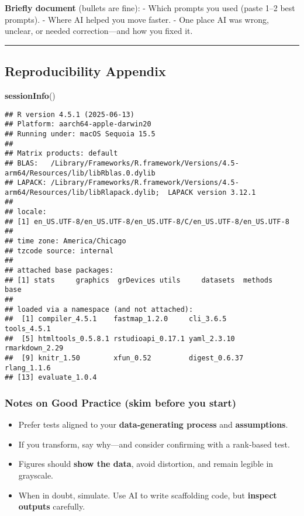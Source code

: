 \documentclass[
  11pt,
]{article}
\newenvironment{Shaded}{\begin{snugshade}}{\end{snugshade}}
\newcommand{\FunctionTok}[1]{\textcolor[rgb]{0.13,0.29,0.53}{\textbf{#1}}}
\newcommand{\NormalTok}[1]{#1}
\providecommand{\tightlist}{%
  \setlength{\itemsep}{0pt}\setlength{\parskip}{0pt}}
\begin{document}
\textbf{Briefly document} (bullets are fine): - Which prompts you used
(paste 1--2 best prompts). - Where AI helped you move faster. - One
place AI was wrong, unclear, or needed correction---and how you fixed
it.

\begin{center}\rule{0.5\linewidth}{0.5pt}\end{center}

\subsection{Reproducibility Appendix}\label{reproducibility-appendix}

\begin{Shaded}
\begin{Highlighting}[]
\FunctionTok{sessionInfo}\NormalTok{()}
\end{Highlighting}
\end{Shaded}

\begin{verbatim}
## R version 4.5.1 (2025-06-13)
## Platform: aarch64-apple-darwin20
## Running under: macOS Sequoia 15.5
## 
## Matrix products: default
## BLAS:   /Library/Frameworks/R.framework/Versions/4.5-arm64/Resources/lib/libRblas.0.dylib 
## LAPACK: /Library/Frameworks/R.framework/Versions/4.5-arm64/Resources/lib/libRlapack.dylib;  LAPACK version 3.12.1
## 
## locale:
## [1] en_US.UTF-8/en_US.UTF-8/en_US.UTF-8/C/en_US.UTF-8/en_US.UTF-8
## 
## time zone: America/Chicago
## tzcode source: internal
## 
## attached base packages:
## [1] stats     graphics  grDevices utils     datasets  methods   base     
## 
## loaded via a namespace (and not attached):
##  [1] compiler_4.5.1    fastmap_1.2.0     cli_3.6.5         tools_4.5.1      
##  [5] htmltools_0.5.8.1 rstudioapi_0.17.1 yaml_2.3.10       rmarkdown_2.29   
##  [9] knitr_1.50        xfun_0.52         digest_0.6.37     rlang_1.1.6      
## [13] evaluate_1.0.4
\end{verbatim}

\subsubsection{Notes on Good Practice (skim before you
start)}\label{notes-on-good-practice-skim-before-you-start}

\begin{itemize}
\tightlist
\item
  Prefer tests aligned to your \textbf{data‑generating process} and
  \textbf{assumptions}.
\item
  If you transform, say why---and consider confirming with a rank‑based
  test.
\item
  Figures should \textbf{show the data}, avoid distortion, and remain
  legible in grayscale.
\item
  When in doubt, simulate. Use AI to write scaffolding code, but
  \textbf{inspect outputs} carefully.
\end{itemize}
\end{document}

